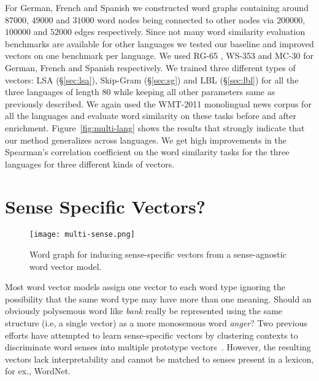 \documentclass[11pt]{article}
\begin{document}
For German, French and Spanish we constructed word graphs containing around $87000$, $49000$
and $31000$ word nodes being connected to other nodes via $200000$, $100000$ and $52000$ 
edges respectively. 
Since not many word similarity evaluation benchmarks are available for other languages 
we tested our baseline and improved vectors on one benchmark per language.
We used RG-65 \cite{Gurevych:2005:USC:2145899.2145986}, WS-353 \cite{Joubarne:2011:CSS:2018192.2018218} 
and MC-30 \cite{Hassan:2009:CSR:1699648.1699665} for German, French and Spanish respectively. 
We trained three different types of vectors: LSA (\S\ref{sec:lsa}), Skip-Gram (\S\ref{sec:sg})
and LBL (\S\ref{sec:lbl}) for all the three languages of length 80 while keeping all other parameters
same as previously described. We again used the WMT-2011 monolingual news corpus for all the 
languages and evaluate word similarity on these tasks before and after enrichment. 
Figure~\ref{fig:multi-lang} shows the results that strongly 
indicate that our method generalizes across languages. We get high improvements in the 
Spearman's correlation coefficient on the word similarity tasks for the three languages for three
different kinds of vectors.

\section{Sense Specific Vectors?}
\label{sec:word-sense}

\begin{figure}[tb]
  \centering
  \texttt{[image: multi-sense.png]}
  \caption{Word graph for inducing sense-specific vectors from a sense-agnostic word vector model.}
  \label{fig:sense-graph}
\end{figure}

Most word vector models assign one vector to each word type
ignoring the possibility that the same word type may have more than one meaning. 
Should an obviously polysemous word like \textit{bank} really be represented using
the same structure (i.e, a single vector) as a more monosemous word \textit{anger}?
Two previous efforts have attempted to learn sense-specific vectors by 
clustering contexts to discriminate
word senses into multiple prototype vectors~\cite{reisinger:naacl10,huang2012improving}. 
However, the resulting vectors
lack interpretability and cannot be matched to senses present in a lexicon,
for ex., WordNet.
\end{document}
